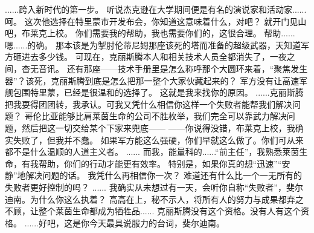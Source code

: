 \documentclass[openany]{book}
\begin{document}
\begin{dialogue}
     ......跨入新时代的第一步。
     听说杰克逊在大学期间便是有名的演说家和活动家......呵。
     这次他选择在特里蒙市开发布会，你知道这意味着什么，对吧？
     就开门见山吧，布莱克上校。
     你们需要我的帮助，我也需要你们的，这很合理。
     帮助......嗯......的确。
     那本该是为掣肘伦蒂尼姆那座该死的塔而准备的超级武器，天知道军方砸进去多少钱。
     可现在，克丽斯腾本人和相关技术人员全都消失了，一夜之间，杳无音讯。
     还有那座——技术手册里是怎么称呼那个大圆环来着，“聚焦发生器”？该死，克丽斯腾到底是怎么把那一整个大家伙藏起来的？
     军方没有让高速军舰包围特里蒙，已经是很温和的选择了。
     这就是我来找你的原因。
     ......克丽斯腾把我耍得团团转，我承认。可我又凭什么相信你这样一个失败者能帮我们解决问题？
     哥伦比亚能够比肩莱茵生命的公司不胜枚举，我们完全可以靠武力解决问题，然后把这一切交给某个下家来兜底——
     ——你说得没错，布莱克上校，我确实失败了，但我并不蠢。
     如果军方能这么强硬，你们早就这么做了。你们可从来都不是什么温顺的人道主义者。
     ......
     而我，能量科的......“前主任”，我熟悉莱茵生命，有我帮助，你们的行动才能更有效率。
     特别是，如果你真的想“迅速”“安静”地解决问题的话。
     我凭什么再相信你一次？
     难道还有什么比一个一无所有的失败者更好控制的吗？
     ......
     我确实从未想过有一天，会听你自称“失败者”，斐尔迪南。为什么你这么执着？
     高高在上，秘不示人，将所有人的努力与成果都弃之不顾，让整个莱茵生命都成为牺牲品......
     克丽斯腾没有这个资格。没有人有这个资格。
     ......好吧，这是你今天最具说服力的台词，斐尔迪南。
\end{dialogue}
\end{document}
